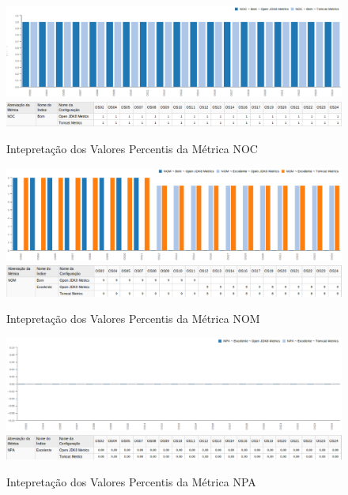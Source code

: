 \begin{apendicesenv}
\begin{figure}
\centering
\includegraphics[scale=0.70]{figuras/noc-grafico.eps}
\includegraphics[scale=0.70]{figuras/noc-tabela.eps}
\caption{Intepretação dos Valores Percentis da Métrica NOC}
\label{fig:metric-noc}
\FloatBarrier
\end{figure}

\begin{figure}
\centering
\includegraphics[scale=0.70]{figuras/nom-grafico.eps}
\includegraphics[scale=0.70]{figuras/nom-tabela.eps}
\caption{Intepretação dos Valores Percentis da Métrica NOM}
\label{fig:metric-nom}
\FloatBarrier
\end{figure}

\begin{figure}
\centering
\includegraphics[scale=0.70]{figuras/npa-grafico.eps}
\includegraphics[scale=0.70]{figuras/npa-tabela.eps}
\caption{Intepretação dos Valores Percentis da Métrica NPA}
\label{fig:metric-npa}
\FloatBarrier
\end{figure}


\end{apendicesenv}
